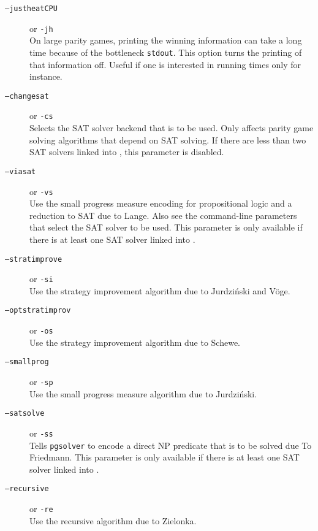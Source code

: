 \begin{description}
\item[{\tt --justheatCPU}] \enspace or {\tt -jh}  \\
   On large parity games, printing the winning information can take a long time because of the bottleneck
   \texttt{stdout}. This option turns the printing of that information off. Useful if one is interested in
   running times only for instance.

\item[{\tt --changesat }] \enspace or {\tt -cs }  \\
   Selects the SAT solver backend that is to be used. Only affects parity game solving algorithms that
   depend on SAT solving. If there are less than two SAT solvers linked into \pgsolver, this parameter
   is disabled.

\item[{\tt --viasat}] \enspace or {\tt -vs} \\
   Use the small progress measure encoding for propositional logic and a reduction to SAT due to Lange.
   Also see the command-line parameters that select the SAT solver to be used.
   This parameter is only available if there is at least one SAT solver linked into \pgsolver.

\item[{\tt --stratimprove}] \enspace or {\tt -si} \\
   Use the strategy improvement algorithm due to Jurdzi{\'n}ski and V\"oge.

\item[{\tt  --optstratimprov}] \enspace or {\tt -os} \\
   Use the strategy improvement algorithm due to Schewe.

\item[{\tt --smallprog}] \enspace or {\tt -sp} \\
   Use the small progress measure algorithm due to Jurdzi{\'n}ski.

\item[{\tt --satsolve}] \enspace or {\tt -ss} \\
   Tells \texttt{pgsolver} to encode a direct NP predicate that is to be solved due To Friedmann.
   This parameter is only available if there is at least one SAT solver linked into \pgsolver.

\item[{\tt --recursive}] \enspace or {\tt -re} \\
   Use the recursive algorithm due to Zielonka.


\end{description}
